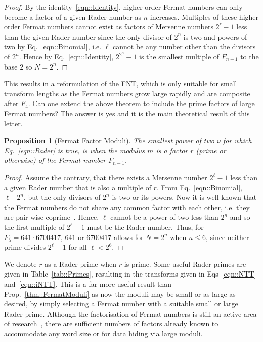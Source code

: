\documentclass[twocolumn]{IEEEtran}
\newtheorem{theorem}{Proposition}
\newcommand{\modulusSymbol}{m}
\newcommand{\eqnTag}{Eq.}
\newcommand{\eqnsTag}{Eqs}
\newcommand{\tabTag}{Table}
\newcommand{\propTag}{Prop.}
\begin{document}
\begin{proof}
By the identity~\eqref{eqn::Identity}, higher order Fermat numbers can only become a factor of a given Rader number as $n$ increases. Multiples of these higher order Fermat numbers cannot exist as factors of Mersenne numbers $2^\ell-1$ less than the given Rader number since the only divisor of $2^n$ is two and powers of two by \eqnTag~\eqref{eqn::Binomial}, i.e. $\ell$ cannot be any number other than the divisors of $2^n$. Hence by \eqnTag~\eqref{eqn::Identity}, $2^{2^n}-1$ is the smallest multiple of $F_{n-1}$ to the base 2 so $N=2^n$.
\end{proof}
This results in a reformulation of the \ac{FNT}, which is only suitable for small transform lengths as the Fermat numbers grow large rapidly and are composite after $F_4$. Can one extend the above theorem to include the prime factors of large Fermat numbers? The answer is yes and it is the main theoretical result of this letter.
\begin{theorem}[Fermat Factor Moduli]\label{thm::FactorModuli}
The smallest power of two $\nu$ for which \eqnTag~\eqref{eqn::Rader} is true, is when the modulus $\modulusSymbol$ is a factor $r$ (prime or otherwise) of the Fermat number $F_{n-1}$.
\end{theorem}
\begin{proof}
Assume the contrary, that there exists a Mersenne number $2^\ell-1$ less than a given Rader number that is also a multiple of $r$. From \eqnTag~\eqref{eqn::Binomial}, $\ell \mid 2^n$, but the only divisors of $2^n$ is two or its powers. Now it is well known that the Fermat numbers do not share any common factor with each other, i.e. they are pair-wise coprime~\citep[pg. 63]{Schumer2004}. Hence, $\ell$ cannot be a power of two less than $2^n$ and so the first multiple of $2^\ell-1$ must be the Rader number. Thus, for $F_5 = 641\cdot 6700417$, $641$ or $6700417$ allows for $N=2^n$ when $n \leqslant 6$, since neither prime divides $2^\ell-1$ for all $\ell < 2^6$.
\end{proof}
We denote $r$ as a Rader prime when $r$ is prime. Some useful Rader primes are given in \tabTag~\ref{tab::Primes}, resulting in the transforms given in \eqnsTag~\eqref{eqn::NTT} and~\eqref{eqn::iNTT}. This is a far more useful result than \propTag~\ref{thm::FermatModuli} as now the moduli may be small or as large as desired, by simply selecting a Fermat number with a suitable small or large Rader prime. Although the factorisation of Fermat numbers is still an active area of research~\citep{Brent1996}, there are sufficient numbers of factors already known to accommodate any word size or for data hiding via large moduli.
\end{document}

